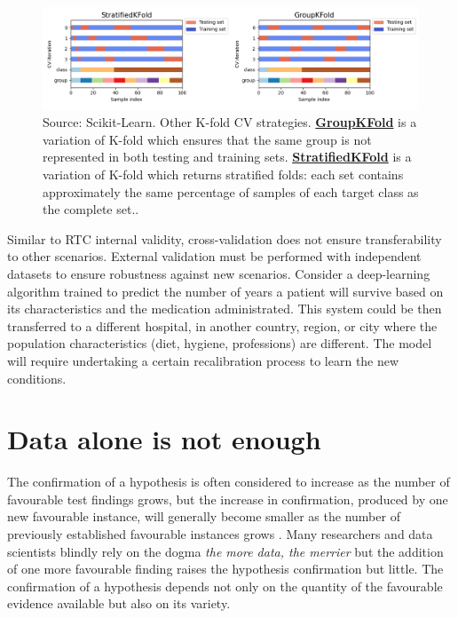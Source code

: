 \documentclass[
]{book}
\begin{document}
\begin{figure}

{\centering \includegraphics[width=1\linewidth]{Figures/kfold-strategies} 

}

\caption{Source: Scikit-Learn. Other K-fold CV strategies. \href{https://scikit-learn.org/stable/modules/cross_validation.html\#group-k-fold}{\textbf{GroupKFold}} is a variation of K-fold which ensures that the same group is not represented in both testing and training sets. \href{https://scikit-learn.org/stable/modules/cross_validation.html\#stratified-k-fold}{\textbf{StratifiedKFold}} is a variation of K-fold which returns stratified folds: each set contains approximately the same percentage of samples of each target class as the complete set..}\label{fig:k-fold-strategies}
\end{figure}

Similar to RTC internal validity, cross-validation does not ensure transferability to other scenarios. External validation must be performed with independent datasets to ensure robustness against new scenarios. Consider a deep-learning algorithm trained to predict the number of years a patient will survive based on its characteristics and the medication administrated. This system could be then transferred to a different hospital, in another country, region, or city where the population characteristics (diet, hygiene, professions) are different. The model will require undertaking a certain recalibration process to learn the new conditions.

\hypertarget{data-is-not-enough}{%
\section{Data alone is not enough}\label{data-is-not-enough}}

The confirmation of a hypothesis is often considered to increase as the number of favourable test findings grows, but the increase in confirmation, produced by one new favourable instance, will generally become smaller as the number of previously established favourable instances grows \citep{hempel-pos}. Many researchers and data scientists blindly rely on the dogma \emph{the more data, the merrier} but the addition of one more favourable finding raises the hypothesis confirmation but little. The confirmation of a hypothesis depends not only on the quantity of the favourable evidence available but also on its variety.
\end{document}
